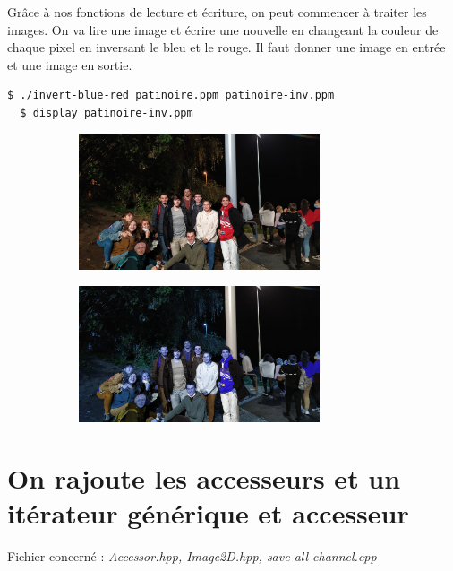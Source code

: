 \documentclass[a4paper,10pt]{article}
\begin{document}
    Grâce à nos fonctions de lecture et écriture, on peut commencer à traiter les images. On va lire une image et écrire une nouvelle en changeant la couleur de chaque pixel en inversant le bleu et le rouge. Il faut donner une image en entrée et une image en sortie.
    \begin{lstlisting}[language=Bash]
  $ ./invert-blue-red patinoire.ppm patinoire-inv.ppm
  $ display patinoire-inv.ppm
  \end{lstlisting}
   \begin{figure}[h]
   \begin{subfigure}{0.6\textwidth}
    \includegraphics[width=1\linewidth, height=4cm]{patinoire}   
    \end{subfigure}
     \begin{subfigure}{0.6\textwidth}
    \includegraphics[width=1\linewidth, height=4cm]{patinoire-inv}   
    \end{subfigure}
    \end{figure}
    \pagebreak
    \section{On rajoute les accesseurs et un itérateur générique et accesseur}
    Fichier concerné : \emph{Accessor.hpp, Image2D.hpp, save-all-channel.cpp}
\end{document}
